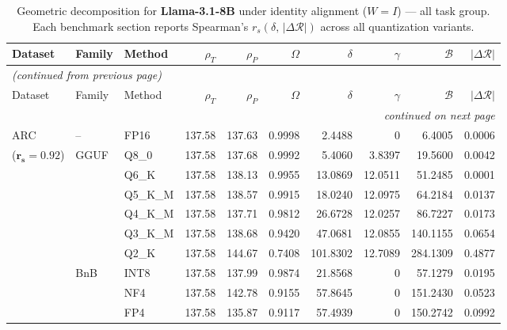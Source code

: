 \begingroup
\small
\setlength{\tabcolsep}{4pt}
\renewcommand{\arraystretch}{1.05}
\setlength{\LTcapwidth}{\textwidth}
\begin{longtable}{ll l rrrrrrr}
\caption{Geometric decomposition for \textbf{Llama-3.1-8B} under identity alignment ($W{=}I$) --- all task group. Each benchmark section reports Spearman's $r_s(\delta,\,|\Delta\mathcal{R}|)$ across all quantization variants.}\label{tab:llama_decomposition_all}\\
\toprule
Dataset & Family & Method & $\rho_T$ & $\rho_P$ & $\Omega$ & $\delta$ & $\gamma$ & $\mathcal{B}$ & $|\Delta\mathcal{R}|$ \\
\midrule
\endfirsthead
\multicolumn{10}{l}{\small\itshape (continued from previous page)}\\
\toprule
Dataset & Family & Method & $\rho_T$ & $\rho_P$ & $\Omega$ & $\delta$ & $\gamma$ & $\mathcal{B}$ & $|\Delta\mathcal{R}|$ \\
\midrule
\endhead
\midrule
\multicolumn{10}{r}{\small\itshape continued on next page}\\
\endfoot
\bottomrule
\endlastfoot
ARC & -- & FP16 & 137.58 & 137.63 & 0.9998 & 2.4488 & \cellcolor{cyan!12} $0$ & 6.4005 & 0.0006 \\
{\small ($\mathbf{r_s{=}0.92}$)} & GGUF & Q8\_0 & 137.58 & 137.68 & 0.9992 & 5.4060 & 3.8397 & 19.5600 & 0.0042 \\
 &  & Q6\_K & 137.58 & 138.13 & 0.9955 & 13.0869 & 12.0511 & 51.2485 & 0.0001 \\
 &  & Q5\_K\_M & 137.58 & 138.57 & 0.9915 & 18.0240 & 12.0975 & 64.2184 & 0.0137 \\
 &  & Q4\_K\_M & 137.58 & 137.71 & 0.9812 & 26.6728 & 12.0257 & 86.7227 & 0.0173 \\
 &  & Q3\_K\_M & 137.58 & 138.68 & \cellcolor{red!18} 0.9420 & \cellcolor{red!18} 47.0681 & 12.0855 & \cellcolor{red!18} 140.1155 & \cellcolor{red!18} 0.0654 \\
 &  & Q2\_K & 137.58 & 144.67 & \cellcolor{red!35} 0.7408 & \cellcolor{red!35} 101.8302 & 12.7089 & \cellcolor{red!35} 284.1309 & \cellcolor{red!35} 0.4877 \\
 & BnB & INT8 & 137.58 & 137.99 & 0.9874 & 21.8568 & \cellcolor{cyan!12} $0$ & 57.1279 & 0.0195 \\
 &  & NF4 & 137.58 & 142.78 & \cellcolor{red!18} 0.9155 & \cellcolor{red!18} 57.8645 & \cellcolor{cyan!12} $0$ & \cellcolor{red!18} 151.2430 & \cellcolor{red!18} 0.0523 \\
 &  & FP4 & 137.58 & 135.87 & \cellcolor{red!18} 0.9117 & \cellcolor{red!18} 57.4939 & \cellcolor{cyan!12} $0$ & \cellcolor{red!18} 150.2742 & \cellcolor{red!18} 0.0992 \\

\end{longtable}
